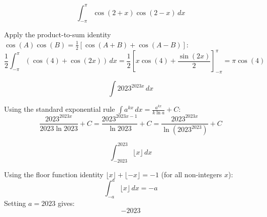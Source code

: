 \begin{questions}
\question
\[ \int_{-\pi}^\pi \cos(2+x)\cos(2-x) \,dx \]
\begin{solution}
Apply the product-to-sum identity $\cos(A)\cos(B) = \frac{1}{2}[\cos(A+B) + \cos(A-B)]$:
\[ \frac{1}{2} \int_{-\pi}^\pi (\cos(4) + \cos(2x)) \,dx = \frac{1}{2} \left[ x\cos(4) + \frac{\sin(2x)}{2} \right]_{-\pi}^\pi = \pi\cos(4) \]
\end{solution}

\question
\[ \int 2023^{2023x} \,dx \]
\begin{solution}
Using the standard exponential rule $\int a^{kx} \,dx = \frac{a^{kx}}{k\ln a} + C$:
\[ \frac{2023^{2023x}}{2023\ln 2023} + C = \frac{2023^{2023x-1}}{\ln 2023} + C = \frac{2023^{2023x}}{\ln(2023^{2023})} + C \]
\end{solution}

\question
\[ \int_{-2023}^{2023} \lfloor x \rfloor \,dx \]
\begin{solution}
Using the floor function identity $\lfloor x \rfloor + \lfloor -x \rfloor = -1$ (for all non-integers $x$):
\[ \int_{-a}^a \lfloor x \rfloor \,dx = -a \]
Setting $a = 2023$ gives:
\[ -2023 \]
\end{solution}

\end{questions}

